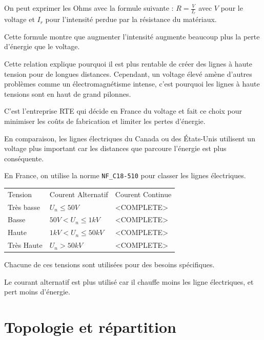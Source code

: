 On peut exprimer les Ohms avec la formule suivante : $R = \frac{V}{I_r}$
avec $V$ pour le voltage et $I_r$ pour l'intensité perdue par la résistance du matériaux.

Cette formule montre que augmenter l'intensité augmente beaucoup plus la perte d'énergie
que le voltage.

Cette relation explique pourquoi il est plus rentable de créer des lignes à haute tension
pour de longues distances.
Cependant, un voltage élevé amène d'autres problèmes comme un électromagnétisme intense,
c'est pourquoi les lignes à haute tensions sont en haut de grand pilonnes.

C'est l'entreprise RTE qui décide en France du voltage et fait ce choix pour minimiser les coûts de
fabrication et limiter les pertes d'énergie.

En comparaison, les lignes électriques du Canada ou des États-Unis utilisent un voltage
plus important car les distances que parcoure l'énergie est plus conséquente.

En France, on utilise la norme \texttt{NF\_C18-510} pour classer les lignes électriques.


\begin{center}
  \begin{table}[h]
    \begin{tabular}{|l|l|l|}
      Tension    & Courent Alternatif     & Courent Continue \\
      Très basse & $U_n \leq 50V$         & <COMPLETE>       \\
      Basse      & $50V < U_n \leq 1kV$   & <COMPLETE>       \\
      Haute      & $1kV < U_n \leq 50kV$  & <COMPLETE>       \\
      Très Haute & $U_n > 50kV$           & <COMPLETE>       \\
    \end{tabular}
  \end{table}
\end{center}

Chacune de ces tensions sont utilisées pour des besoins spécifiques.

Le courant alternatif est plus utilisé car il chauffe moins les ligne électriques,
et pert moins d'énergie.

\section{Topologie et répartition}

